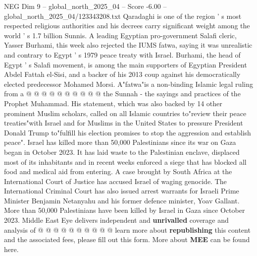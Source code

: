 \begin{textsample}{NEG Dim 9 – global\_north\_2025\_04 – Score -6.00 – global\_north\_2025\_04/123343208.txt}
Qaradaghi is one of the region ' s most respected religious authorities and his decrees carry significant weight among the world ' s 1.7 billion Sunnis.
A leading Egyptian pro-government Salafi cleric, Yasser Burhami, this week also rejected the IUMS fatwa, saying it was unrealistic and contrary to Egypt ' s 1979 peace treaty with Israel.
Burhami, the head of Egypt ' s Salafi movement, is among the main supporters of Egyptian President Abdel Fattah el-Sisi, and a backer of his 2013 coup against his democratically elected predecessor Mohamed Morsi.
A"fatwa"is a non-binding Islamic legal ruling from a @ @ @ @ @ @ @ @ @ @ the Sunnah - the sayings and practices of the Prophet Muhammad.
His statement, which was also backed by 14 other prominent Muslim scholars, called on all Islamic countries to"review their peace treaties"with Israel and for Muslims in the United States to pressure President Donald Trump to"fulfill his election promises to stop the aggression and establish peace".
Israel has killed more than 50,000 Palestinians since its war on Gaza began in October 2023.
It has laid waste to the Palestinian enclave, displaced most of its inhabitants and in recent weeks enforced a siege that has blocked all food and medical aid from entering.
A case brought by South Africa at the International Court of Justice has accused Israel of waging genocide.
The International Criminal Court has also issued arrest warrants for Israeli Prime Minister Benjamin Netanyahu and his former defence minister, Yoav Gallant.
More than 50,000 Palestinians have been killed by Israel in Gaza since October 2023.
Middle East Eye delivers independent and \textbf{unrivalled} coverage and analysis of @ @ @ @ @ @ @ @ @ @ learn more about \textbf{republishing} this content and the associated fees, please fill out this form.
More about \textbf{MEE} can be found here.

\end{textsample}
